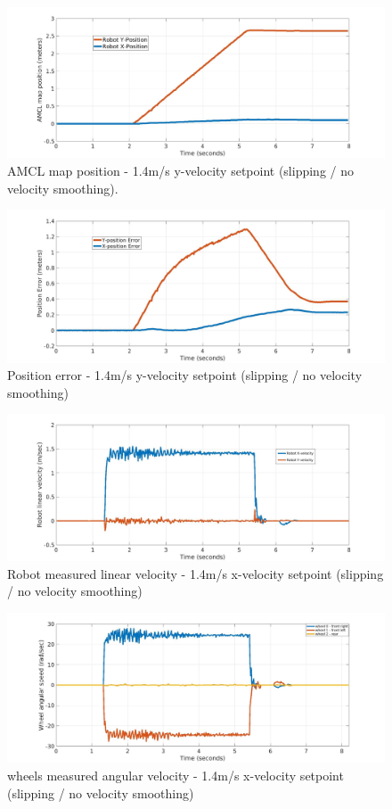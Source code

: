\begin{figure}[H]
	\centering
	\includegraphics[width=12cm]{images/03-foundation/amcl14y}
	\caption{AMCL map position - 1.4m/s y-velocity setpoint (slipping / no velocity smoothing).} 
	\label{amcl14y}
\end{figure}

\begin{figure}[H]
	\centering
	\includegraphics[width=12cm]{images/03-foundation/poserror14y}
	\caption{Position error - 1.4m/s y-velocity setpoint (slipping / no velocity smoothing)} 
	\label{poserror14y}
\end{figure}

\begin{figure}[H]
	\centering
	\includegraphics[width=12cm]{images/03-foundation/vel14}
	\caption{Robot measured linear velocity - 1.4m/s x-velocity setpoint (slipping / no velocity smoothing)} 
	\label{vel14}
\end{figure}

\begin{figure}[H]
	\centering
	\includegraphics[width=12cm]{images/03-foundation/wheel14}
	\caption{wheels measured angular velocity - 1.4m/s x-velocity setpoint (slipping / no velocity smoothing)} 
	\label{wheel14}
\end{figure}

